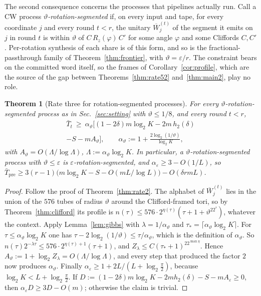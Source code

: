\documentclass[aps,prx,twocolumn,superscriptaddress,nofootinbib,longbibliography]{revtex4-2}
\theoremstyle{plain}
\newtheorem{theorem}{Theorem}
\theoremstyle{definition}
\theoremstyle{remark}
\newcommand{\Tpre}{T_{\mathrm{pre}}}
\begin{document}
The second consequence concerns the processes that pipelines actually run. Call a CW process \emph{$\vartheta$-rotation-segmented} if, on every input and tape, for every coordinate $j$ and every round $t<r$, the unitary $\overline W^{(t)}_j$ of the segment it emits on $j$ in round $t$ is within $\vartheta$ of $C\,R_z(\varphi)\,C'$ for some angle $\varphi$ and some Cliffords $C,C'$. Per-rotation synthesis of each share is of this form, and so is the fractional-passthrough family of Theorem~\ref{thm:frontier}, with $\vartheta=\varepsilon/r$. The constraint bears on the committed word itself, so the frames of Corollary~\ref{cor:profile}, which are the source of the gap between Theorems~\ref{thm:rate52} and~\ref{thm:main2}, play no role.

\begin{theorem}[Rate three for rotation-segmented processes]\label{thm:rate3seg}
For every $\vartheta$-rotation-segmented process as in Sec.~\ref{sec:setting} with $\vartheta\le1/8$, and every round $t<r$,
\begin{multline}\label{eq:rate3seg}
\bar T_t\ \ge\ \alpha_\vartheta\big[(1-2\delta)m\log_2K-2m\,h_2(\delta)\\-S-mA_\vartheta\big],\qquad\alpha_\vartheta:=1+\frac{2\log_2(1/\vartheta)}{\log_2K},
\end{multline}
with $A_\vartheta=O(\Lambda/\log\Lambda)$, $\Lambda:=\alpha_\vartheta\log_2K$. In particular, a $\vartheta$-rotation-segmented process with $\vartheta\le\varepsilon$ is $\varepsilon$-rotation-segmented, and $\alpha_\varepsilon\ge3-O(1/L)$, so $\bar\Tpre\ge3(r-1)\big(m\log_2K-S-O(mL/\log L)\big)-O(\delta rmL)$.
\end{theorem}
\begin{proof}
Follow the proof of Theorem~\ref{thm:rate2}. The alphabet of $\overline W^{(t)}_j$ lies in the union of the $576$ tubes of radius $\vartheta$ around the Clifford-framed tori, so by Theorem~\ref{thm:clifford} its profile is $n(\tau)\le576\cdot2^{\eta(\tau)}(\tau+1+\vartheta^22^\tau)$, whatever the context. Apply Lemma~\ref{lem:gibbs} with $\lambda=1/\alpha_\vartheta$ and $\tau_*=\lceil\alpha_\vartheta\log_2K\rceil$. For $\tau\le\alpha_\vartheta\log_2K$ one has $\tau-2\log_2(1/\vartheta)\le\tau/\alpha_\vartheta$, which is the definition of $\alpha_\vartheta$. So $n(\tau)2^{-\lambda\tau}\le576\cdot2^{\eta(\tau)+1}(\tau+1)$, and $Z_\lambda\le C(\tau_*+1)^22^{\max\eta}$. Hence $A_\vartheta:=1+\log_2Z_\lambda=O(\Lambda/\log\Lambda)$, and every step that produced the factor $2$ now produces $\alpha_\vartheta$. Finally $\alpha_\varepsilon\ge1+2L/(L+\log_2\frac\pi2)$, because $\log_2K<L+\log_2\frac\pi2$. If $D:=(1-2\delta)m\log_2K-2mh_2(\delta)-S-mA_\varepsilon\ge0$, then $\alpha_\varepsilon D\ge3D-O(m)$; otherwise the claim is trivial.
\end{proof}
\end{document}

